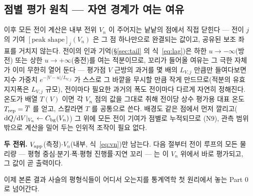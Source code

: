 \subsection{점별 평가 원칙 --- 자연 경계가 여는 여유}\label{sec:pointwise}
이후 모든 전이 계산은 내부 전위 $V_n$ 이 주어지는 낱낱의 점에서 직접 닫힌다 --- 전이 $j$ 의 기여
$[\text{peak shape}]_j(V_n)$ 은 그 점 하나만으로 완결되는 값이고, 공유된 보조 좌표를 거치지 않는다.
전이의 인과 기억(\S\ref{sec:tail} 의 식~\eqref{eq:lag})은 하한 $u\to-\infty$(방전) 또는 상한
$u\to+\infty$(충전)를 여는 적분이므로, 꼬리가 들어올 여유는 그 극한 자체가 이미 무한히 열어 둔다 ---
평가점 $V$ 근방의 과거를 몇 배의 $L_{V,j}$ 만큼만 들여다보면 지수 가중치 $e^{-|V-u|/L_{V,j}}$ 가 스스로
그 바깥을 무시할 만큼 작게 만드므로(적분의 유효 지지폭은 $L_{V,j}$ 규모), 전이마다 필요한 과거의 폭도
전이마다 다르게 자연히 정해진다. 온도가 배열 $T(V)$ 이면 각 $V_n$ 점의 값을 그대로 취해 전이당 상수
평가용 대표 온도 $T_{\mathrm{rep}}=\overline{T}$ 를 얻고, 스칼라면 $T$ 를 공통으로 쓴다. 배경도 같은 점에서
먼저 깔리고($\mathrm{d} Q/\mathrm{d} V|_{V_n}\leftarrow C_{\mathrm{bg}}(V_n)$) 그 위에 모든 전이 기여가 점별로 누적되므로
($\mathrm N9$), 관측 범위 밖으로 계산을 밀어 두는 인위적 조작이 필요 없다.

\begin{keybox}
\textbf{두 전위.} $V_{\mathrm{app}}$(측정)$\cdot$$V_n$(내부, 식~\eqref{eq:vn})만 남는다. 다음 절부터 전이 루프의 모든
물리량 --- 평형 중심$\cdot$분기$\cdot$폭$\cdot$평형 진행률$\cdot$지연 꼬리 --- 는 이 $V_n$ 위에서 바로
평가되고, 그 값이 곧 출력이다.
\end{keybox}

이제 본론 결과 사슬의 평형식들이 어디서 오는지를 통계역학 첫 원리에서 놓는 Part 0 로 넘어간다.

